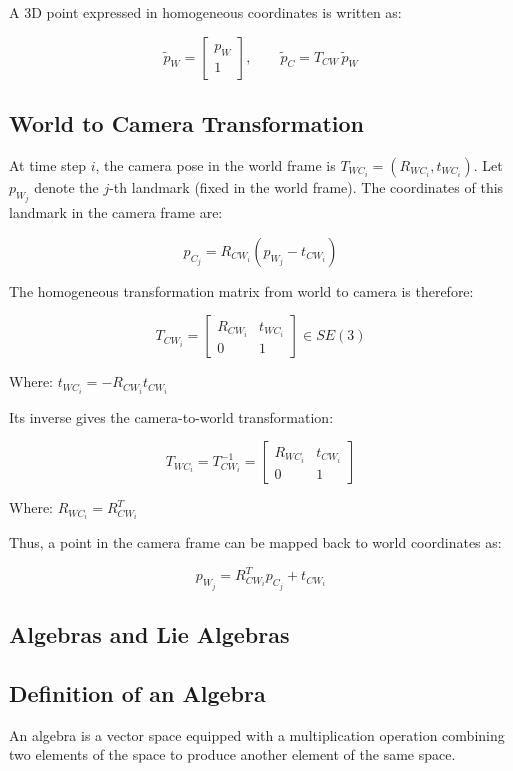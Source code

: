 \documentclass[11pt,a4paper]{article}
\begin{document}
A 3D point expressed in homogeneous coordinates is written as:

\[
\tilde{p}_W =
\begin{bmatrix}
p_W \\ 1
\end{bmatrix}, \qquad
\tilde{p}_C = T_{CW} \, \tilde{p}_W
\]

\subsection*{World to Camera Transformation}

At time step \( i \), the camera pose in the world frame is
\( T_{WC_i} = (R_{WC_i}, t_{WC_i}) \).
Let \( p_{W_j} \) denote the \( j \)-th landmark (fixed in the world frame).
The coordinates of this landmark in the camera frame are:

\[
p_{C_j} = R_{CW_i} (p_{W_j} - t_{CW_i})
\]

The homogeneous transformation matrix from world to camera is therefore:

\[
T_{CW_i} =
\begin{bmatrix}
R_{CW_i} & t_{WC_i} \\
0 & 1
\end{bmatrix} \in SE(3)
\]

Where: \( t_{WC_i} = -R_{CW_i} t_{CW_i} \)

Its inverse gives the camera-to-world transformation:

\[
T_{WC_i} = T_{CW_i}^{-1} =
\begin{bmatrix}
R_{WC_i} & t_{CW_i} \\
0 & 1
\end{bmatrix}
\]

Where: \( R_{WC_i} = R_{CW_i}^T \)

Thus, a point in the camera frame can be mapped back to world coordinates as:

\[
p_{W_j} = R_{CW_i}^T p_{C_j} + t_{CW_i}
\]

\subsection*{Algebras and Lie Algebras}

\subsection*{Definition of an Algebra}
An algebra is a vector space equipped with a multiplication operation combining two elements of the space to produce another element of the same space.
\end{document}
